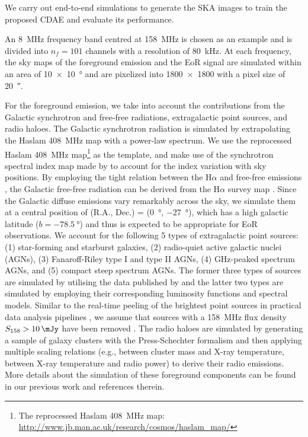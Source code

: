 \documentclass[fleqn,usenatbib]{mnras}
\newcommand{\editwip}[1]{{\leavevmode\color{magenta}#1}}
\begin{document}
We carry out end-to-end simulations to generate the SKA images to
train the proposed CDAE and evaluate its performance.
\editwip{%
An \SI{8}{\MHz} frequency band centred at \SI{158}{\MHz} is chosen as
an example and is divided into $n_f = 101$ channels with a resolution of
\SI{80}{\kHz}.
At each frequency, the sky maps of the foreground emission and the EoR
signal are simulated within an area of \SI{10 x 10}{\degree} and are
pixelized into \num{1800 x 1800} with a pixel size of \SI{20}{\arcsecond}.

For the foreground emission, we take into account the contributions from
the Galactic synchrotron and free-free radiations, extragalactic point
sources, and radio haloes.
The Galactic synchrotron radiation is simulated by extrapolating the Haslam
\SI{408}{\MHz} map with a power-law spectrum.  We use the reprocessed
Haslam \SI{408}{\MHz} map\footnote{%
  The reprocessed Haslam \SI{408}{\MHz} map:
  \url{http://www.jb.man.ac.uk/research/cosmos/haslam_map/}}
\citep{remazeilles2015} as the template, and make use of the synchrotron
spectral index map made by \citet{giardino2002} to account for the index
variation with sky positions.
By employing the tight relation between the H$\alpha$ and free-free
emissions \citep[see][and references therein]{dickinson2003}, the Galactic
free-free radiation can be derived from the H$\alpha$ survey map
\citep{finkbeiner2003}.
Since the Galactic diffuse emissions vary remarkably across the sky, we
simulate them at a central position of (R.A., Dec\@.) = (\SI{0}{\degree},
\SI{-27}{\degree}), which has a high galactic latitude
($b = \SI{-78.5}{\degree}$) and thus is expected to be appropriate for
EoR observations.
We account for the following 5 types of extragalactic point sources:
(1) star-forming and starburst galaxies, (2) radio-quiet active galactic
nuclei (AGNs), (3) Fanaroff-Riley type I and type II AGNs, (4) GHz-peaked
spectrum AGNs, and (5) compact steep spectrum AGNs.
The former three types of sources are simulated by utilising the data
published by \citet{wilman2008} and the latter two types are simulated by
employing their corresponding luminosity functions and spectral models.
Similar to the real-time peeling of the brightest point sources in
practical data analysis pipelines \citep[e.g.,][]{mitchell2008,intema2009},
we assume that sources with a \SI{158}{\MHz} flux density
$S_{158} > \SI{10}{\mJy}$ have been removed \citep[e.g.,][]{liu2009ps}.
The radio haloes are simulated by generating a sample of galaxy clusters
with the Press-Schechter formalism \citep{press1974} and then applying
multiple scaling relations (e.g., between cluster mass and X-ray
temperature, between X-ray temperature and radio power) to derive their
radio emissions.
More details about the simulation of these foreground components can be
found in our previous work \citep{wang2010} and references therein.

}
\end{document}
